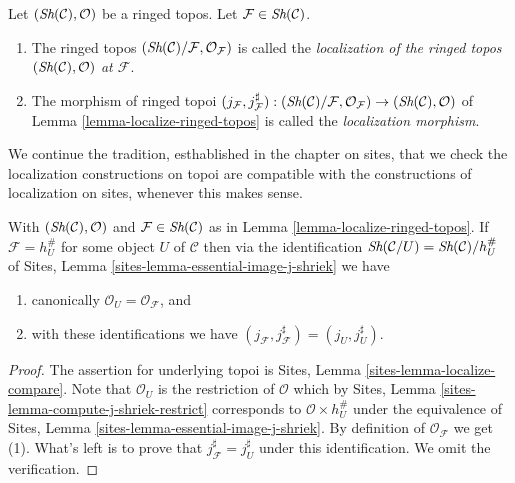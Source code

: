 \begin{definition}
\label{definition-localize-ringed-topos}
Let $(\mathop{\textit{Sh}}\nolimits(\mathcal{C}), \mathcal{O})$ be a ringed topos.
Let $\mathcal{F} \in \mathop{\textit{Sh}}\nolimits(\mathcal{C})$.
\begin{enumerate}
\item The ringed topos
$(\mathop{\textit{Sh}}\nolimits(\mathcal{C})/\mathcal{F}, \mathcal{O}_\mathcal{F})$
is called the
{\it localization of the ringed topos
$(\mathop{\textit{Sh}}\nolimits(\mathcal{C}), \mathcal{O})$ at $\mathcal{F}$}.
\item The morphism of ringed topoi
$(j_\mathcal{F}, j_\mathcal{F}^\sharp) :
(\mathop{\textit{Sh}}\nolimits(\mathcal{C})/\mathcal{F}, \mathcal{O}_\mathcal{F})
\to
(\mathop{\textit{Sh}}\nolimits(\mathcal{C}), \mathcal{O})$ of
Lemma \ref{lemma-localize-ringed-topos}
is called the {\it localization morphism}.
\end{enumerate}
\end{definition}

\noindent
We continue the tradition, esthablished in the chapter on sites, that we
check the localization constructions on topoi are compatible with the
constructions of localization on sites, whenever this makes sense.

\begin{lemma}
\label{lemma-localize-compare}
With
$(\mathop{\textit{Sh}}\nolimits(\mathcal{C}), \mathcal{O})$ and
$\mathcal{F} \in \mathop{\textit{Sh}}\nolimits(\mathcal{C})$ as in
Lemma \ref{lemma-localize-ringed-topos}.
If $\mathcal{F} = h_U^\#$ for some object $U$ of $\mathcal{C}$
then via the identification
$\mathop{\textit{Sh}}\nolimits(\mathcal{C}/U) = \mathop{\textit{Sh}}\nolimits(\mathcal{C})/h_U^\#$ of
Sites, Lemma \ref{sites-lemma-essential-image-j-shriek}
we have
\begin{enumerate}
\item canonically $\mathcal{O}_U = \mathcal{O}_\mathcal{F}$, and
\item with these identifications
we have $(j_\mathcal{F}, j_\mathcal{F}^\sharp) = (j_U, j_U^\sharp)$.
\end{enumerate}
\end{lemma}

\begin{proof}
The assertion for underlying topoi is
Sites, Lemma \ref{sites-lemma-localize-compare}.
Note that $\mathcal{O}_U$ is the restriction of $\mathcal{O}$
which by
Sites, Lemma \ref{sites-lemma-compute-j-shriek-restrict}
corresponds to $\mathcal{O} \times h_U^\#$ under the equivalence of
Sites, Lemma \ref{sites-lemma-essential-image-j-shriek}.
By definition of $\mathcal{O}_\mathcal{F}$ we get (1).
What's left is to prove that $j_\mathcal{F}^\sharp = j_U^\sharp$
under this identification. We omit the verification.
\end{proof}

